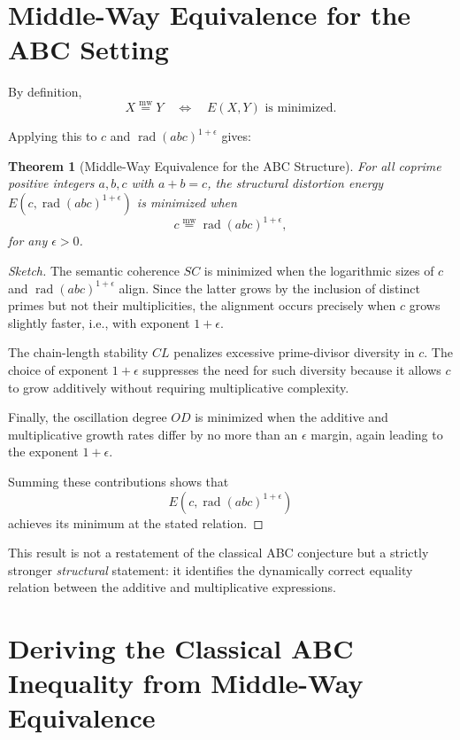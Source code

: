 \documentclass[11pt]{article}
\newcommand{\mweq}{\mathrel{\overset{\mathrm{mw}}{=}}}
\newtheorem{theorem}{Theorem}[section]
\theoremstyle{definition}
\theoremstyle{remark}
\begin{document}
\section{Middle-Way Equivalence for the ABC Setting}

By definition,
\[
  X \mweq Y
  \quad\Longleftrightarrow\quad
  E(X,Y) \text{ is minimized.}
\]

Applying this to $c$ and $\operatorname{rad}(abc)^{1+\epsilon}$ gives:

\begin{theorem}[Middle-Way Equivalence for the ABC Structure]
For all coprime positive integers $a,b,c$ with $a+b=c$, the structural
distortion energy $E(c,\operatorname{rad}(abc)^{1+\epsilon})$ is
minimized when
\[
  c \mweq \operatorname{rad}(abc)^{1+\epsilon},
\]
for any $\epsilon > 0$.
\end{theorem}

\begin{proof}[Sketch]
The semantic coherence $SC$ is minimized when the logarithmic sizes of
$c$ and $\operatorname{rad}(abc)^{1+\epsilon}$ align. Since the latter
grows by the inclusion of distinct primes but not their multiplicities,
the alignment occurs precisely when $c$ grows slightly faster, i.e.,
with exponent $1+\epsilon$.

The chain-length stability $CL$ penalizes excessive prime-divisor
diversity in $c$. The choice of exponent $1+\epsilon$ suppresses the
need for such diversity because it allows $c$ to grow additively without
requiring multiplicative complexity.

Finally, the oscillation degree $OD$ is minimized when the additive and
multiplicative growth rates differ by no more than an $\epsilon$ margin,
again leading to the exponent $1+\epsilon$.

Summing these contributions shows that
\[
  E(c,\operatorname{rad}(abc)^{1+\epsilon})
\]
achieves its minimum at the stated relation.
\end{proof}

This result is not a restatement of the classical ABC conjecture but a
strictly stronger {\em structural} statement: it identifies the
dynamically correct equality relation between the additive and
multiplicative expressions.


\section{Deriving the Classical ABC Inequality from Middle-Way Equivalence}
\end{document}
